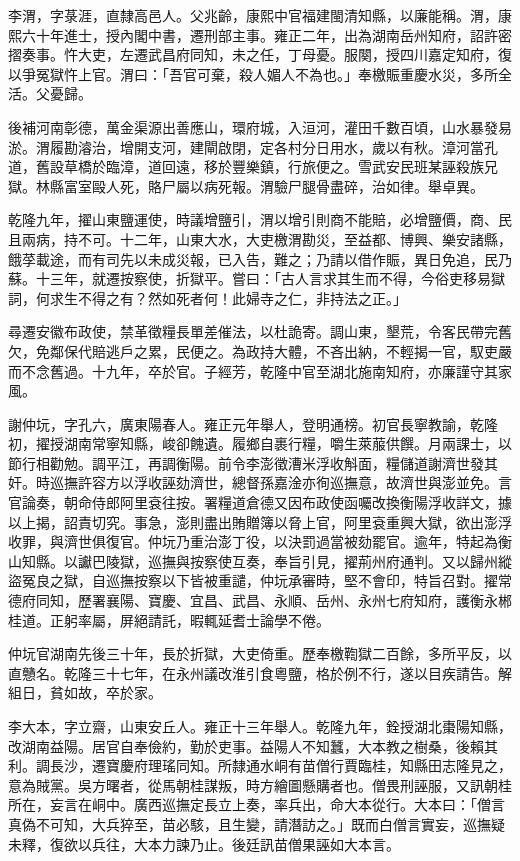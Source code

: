 \begin{pinyinscope}
李渭，字菉涯，直隸高邑人。父兆齡，康熙中官福建閩清知縣，以廉能稱。渭，康熙六十年進士，授內閣中書，遷刑部主事。雍正二年，出為湖南岳州知府，詔許密摺奏事。忤大吏，左遷武昌府同知，未之任，丁母憂。服闋，授四川嘉定知府，復以爭冤獄忤上官。渭曰：「吾官可棄，殺人媚人不為也。」奉檄賑重慶水災，多所全活。父憂歸。

後補河南彰德，萬金渠源出善應山，環府城，入洹河，灌田千數百頃，山水暴發易淤。渭履勘濬治，增開支河，建閘啟閉，定各村分日用水，歲以有秋。漳河當孔道，舊設草橋於臨漳，道回遠，移於豐樂鎮，行旅便之。雪武安民班某誣殺族兄獄。林縣富室毆人死，賂尸屬以病死報。渭驗尸腿骨盡碎，治如律。舉卓異。

乾隆九年，擢山東鹽運使，時議增鹽引，渭以增引則商不能賠，必增鹽價，商、民且兩病，持不可。十二年，山東大水，大吏檄渭勘災，至益都、博興、樂安諸縣，餓莩載途，而有司先以未成災報，已入告，難之；乃請以借作賑，異日免追，民乃蘇。十三年，就遷按察使，折獄平。嘗曰：「古人言求其生而不得，今俗吏移易獄詞，何求生不得之有？然如死者何！此婦寺之仁，非持法之正。」

尋遷安徽布政使，禁革徵糧長單差催法，以杜詭寄。調山東，墾荒，令客民帶完舊欠，免鄰保代賠逃戶之累，民便之。為政持大體，不吝出納，不輕揭一官，馭吏嚴而不念舊過。十九年，卒於官。子經芳，乾隆中官至湖北施南知府，亦廉謹守其家風。

謝仲坃，字孔六，廣東陽春人。雍正元年舉人，登明通榜。初官長寧教諭，乾隆初，擢授湖南常寧知縣，峻卻餽遺。履鄉自裹行糧，嚼生萊菔供饌。月兩課士，以節行相勸勉。調平江，再調衡陽。前令李澎徵漕米浮收斛面，糧儲道謝濟世發其奸。時巡撫許容方以浮收誣劾濟世，總督孫嘉淦亦徇巡撫意，故濟世與澎並免。言官論奏，朝命侍郎阿里袞往按。署糧道倉德又因布政使函囑改換衡陽浮收詳文，據以上揭，詔責切究。事急，澎則盡出賄贈簿以脅上官，阿里袞重興大獄，欲出澎浮收罪，與濟世俱復官。仲坃乃重治澎丁役，以決罰過當被劾罷官。逾年，特起為衡山知縣。以讞巴陵獄，巡撫與按察使互奏，奉旨引見，擢荊州府通判。又以歸州縱盜冤良之獄，自巡撫按察以下皆被重譴，仲坃承審時，堅不會印，特旨召對。擢常德府同知，歷署襄陽、寶慶、宜昌、武昌、永順、岳州、永州七府知府，護衡永郴桂道。正躬率屬，屏絕請託，暇輒延耆士論學不倦。

仲坃官湖南先後三十年，長於折獄，大吏倚重。歷奉檄鞫獄二百餘，多所平反，以直戇名。乾隆三十七年，在永州議改淮引食粵鹽，格於例不行，遂以目疾請告。解組日，貧如故，卒於家。

李大本，字立齋，山東安丘人。雍正十三年舉人。乾隆九年，銓授湖北棗陽知縣，改湖南益陽。居官自奉儉約，勤於吏事。益陽人不知蠶，大本教之樹桑，後賴其利。調長沙，遷寶慶府理瑤同知。所隸通水峒有苗僧行賈臨桂，知縣田志隆見之，意為賊黨。吳方曙者，從馬朝桂謀叛，時方繪圖懸購者也。僧畏刑誣服，又訊朝桂所在，妄言在峒中。廣西巡撫定長立上奏，率兵出，命大本從行。大本曰：「僧言真偽不可知，大兵猝至，苗必駭，且生變，請潛訪之。」既而白僧言實妄，巡撫疑未釋，復欲以兵往，大本力諫乃止。後廷訊苗僧果誣如大本言。


\end{pinyinscope}

